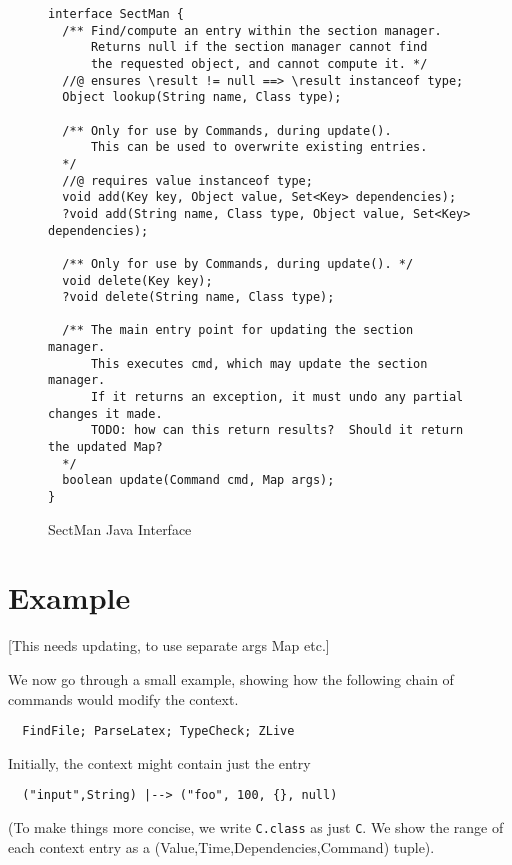 \documentclass{llncs} %
\begin{document}
\begin{figure}[htbp]
  \centering
\begin{small}
\begin{verbatim}
interface SectMan {
  /** Find/compute an entry within the section manager.
      Returns null if the section manager cannot find
      the requested object, and cannot compute it. */ 
  //@ ensures \result != null ==> \result instanceof type;
  Object lookup(String name, Class type);

  /** Only for use by Commands, during update().
      This can be used to overwrite existing entries.
  */
  //@ requires value instanceof type;
  void add(Key key, Object value, Set<Key> dependencies);
  ?void add(String name, Class type, Object value, Set<Key> dependencies);

  /** Only for use by Commands, during update(). */
  void delete(Key key);
  ?void delete(String name, Class type);

  /** The main entry point for updating the section manager.
      This executes cmd, which may update the section manager.
      If it returns an exception, it must undo any partial changes it made.
      TODO: how can this return results?  Should it return the updated Map?
  */
  boolean update(Command cmd, Map args);
}
\end{verbatim}
\end{small}
  \caption{SectMan Java Interface}
  \label{fig:sectman}
\end{figure}


\section{Example}

[This needs updating, to use separate args Map etc.]

We now go through a small example, showing how the following
chain of commands would modify the context.
\begin{verbatim}
  FindFile; ParseLatex; TypeCheck; ZLive
\end{verbatim}

Initially, the context might contain just the entry
\begin{small}
\begin{verbatim}
  ("input",String) |--> ("foo", 100, {}, null)
\end{verbatim}
\end{small}
(To make things more concise, we write \texttt{C.class} as just \texttt{C}.
We show the range of each context entry as a (Value,Time,Dependencies,Command)
tuple). 
\end{document}
